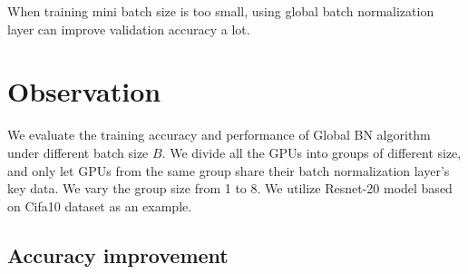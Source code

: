 \documentclass{llncs}
\begin{document}
When training mini batch size is too small, using global batch normalization layer can improve validation accuracy a lot.


\section{Observation}

We evaluate the training accuracy and performance of Global BN algorithm under different batch size $B$. 
We divide all the GPUs into groups of different size,
and only let GPUs from the same group share their batch normalization layer's key data. 
We vary the group size from 1 to 8.
We utilize Resnet-20 model based on Cifa10 dataset as an example.


\subsection{Accuracy improvement}
\end{document}

